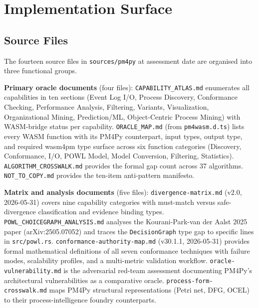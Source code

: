 
\section{Implementation Surface}
\label{sec:sources-pm4py-impl}

\subsection{Source Files}
\label{sec:sources-pm4py-impl-source}

The fourteen source files in \texttt{sources/pm4py} at assessment date are organised into
three functional groups.

\textbf{Primary oracle documents} (four files): \texttt{CAPABILITY\_ATLAS.md} enumerates
all capabilities in ten sections (Event Log I/O, Process Discovery, Conformance Checking,
Performance Analysis, Filtering, Variants, Visualization, Organizational Mining, Prediction/ML,
Object-Centric Process Mining) with WASM-bridge status per capability.
\texttt{ORACLE\_MAP.md} (from \texttt{pm4wasm.d.ts}) lists every WASM function with its
PM4Py counterpart, input types, output type, and required wasm4pm type surface across
six function categories (Discovery, Conformance, I/O, POWL Model, Model Conversion,
Filtering, Statistics). \texttt{ALGORITHM\_CROSSWALK.md} provides the formal gap count
across 37 algorithms. \texttt{NOT\_TO\_COPY.md} provides the ten-item anti-pattern
manifesto.

\textbf{Matrix and analysis documents} (five files): \texttt{divergence-matrix.md}
(v2.0, 2026-05-31) covers nine capability categories with must-match versus safe-divergence
classification and evidence binding types. \texttt{POWL\_CHOICEGRAPH\_ANALYSIS.md}
analyses the Kourani-Park-van der Aalst 2025 paper (arXiv:2505.07052) and traces the
\texttt{DecisionGraph} type gap to specific lines in \texttt{src/powl.rs}.
\texttt{conformance-authority-map.md} (v30.1.1, 2026-05-31) provides formal mathematical
definitions of all seven conformance techniques with failure modes, scalability profiles,
and a multi-metric validation workflow. \texttt{oracle-vulnerability.md} is the adversarial
red-team assessment documenting PM4Py's architectural vulnerabilities as a comparative
oracle. \texttt{process-form-crosswalk.md} maps PM4Py structural representations (Petri
net, DFG, OCEL) to their process-intelligence foundry counterparts.

